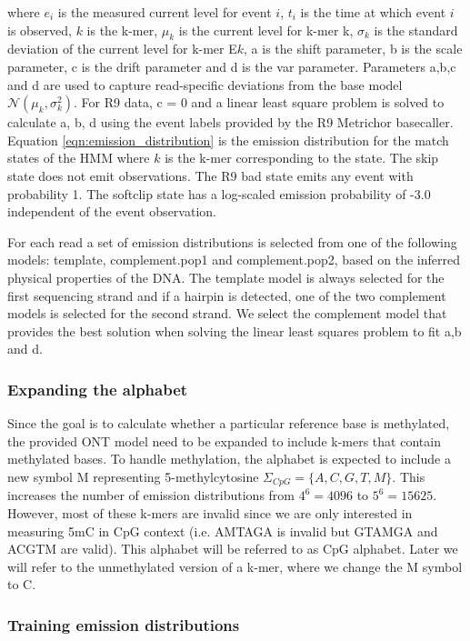 where $e_i$ is the measured current level for event $i$, $t_i$ is the time at which event $i$ is observed, $k$ is the k-mer, $\mu_k$ is the current level for k-mer k, $\sigma_k$ is the standard deviation of the current level for k-mer E$k$, a is the shift parameter, b is the scale parameter, c is the drift parameter and d is the var parameter. Parameters a,b,c and d are used to capture read-specific deviations from the base model $\mathcal{N}(\mu_k, \sigma_k^2)$. For R9 data, c = 0 and a linear least square problem is solved to calculate a, b, d using the event labels provided by the R9 Metrichor basecaller.
Equation \ref{eqn:emission_distribution} is the emission distribution for the match states of the HMM where $k$ is the
k-mer corresponding to the state. The skip state does not emit observations. The R9 bad state emits any event with probability 1. The softclip state has a log-scaled emission probability of -3.0 independent of the event observation. 

For each read a set of emission distributions is selected from one of the following models: template, complement.pop1 and complement.pop2, based on the inferred physical properties of the DNA. The template model is always selected for the first sequencing strand and if a hairpin is detected, one of the two complement models is selected for the second strand. We select the complement model that provides the best solution when solving the linear least squares problem to fit a,b and d. 

\subsubsection{Expanding the alphabet}
Since the goal is to calculate whether a particular reference base is methylated, the provided ONT model need to be expanded to include k-mers that contain methylated bases. To handle methylation, the alphabet is expected to include a new symbol M representing 5-methylcytosine $\Sigma_{CpG} = \{ A,C,G,T,M\}$. This increases the number of emission distributions from $4^6=4096$ to $5^6=15625$. However, most of these k-mers are invalid since we are only interested in measuring 5mC in CpG context (i.e. AMTAGA is invalid but GTAMGA and ACGTM are valid). This alphabet will be referred to as CpG alphabet. Later we will refer to the unmethylated version of a k-mer, where we change the M symbol to C.

\subsubsection{Training emission distributions}

